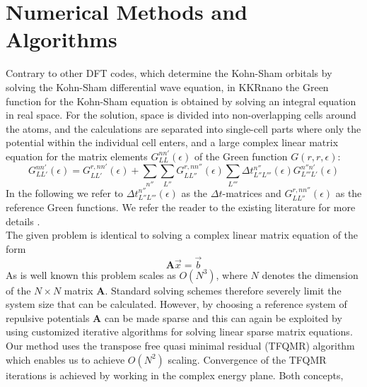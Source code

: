 \documentclass [a4paper, 12pt]{article}
\newcommand{\matr}[1]{\bm{#1}}
\begin{document}
\section{Numerical Methods and Algorithms} 
 

Contrary to other DFT codes, which determine the Kohn-Sham orbitals by solving
the Kohn-Sham differential wave equation, in KKRnano the Green function for the Kohn-Sham
equation is obtained by solving an integral equation in real space. For the solution, space is divided
into non-overlapping cells around the atoms, and the calculations are separated into single-cell parts
where only the potential within the individual cell enters, and a large complex linear matrix equation for 
the matrix elements $G_{LL}^{nn'} (\epsilon)$ of the Green function $G(r, r , \epsilon)$:
\begin{equation}
	G_{LL'}^{nn'} (\epsilon) = G_{LL'}^{r,nn'} (\epsilon) + \sum_{n''} \sum_{L''}
	G_{LL''}^{r,nn''} (\epsilon) \sum_{L'''} \Delta t_{L'' L'''}^{n''} (\epsilon)
	G_{L'''L'}^{n''n'} (\epsilon)
	\label{eq:dyson_eq}
\end{equation}
In the following we refer to $\Delta t_{L'' L'''}^{n''} (\epsilon)$ as the $\Delta t$-matrices and
$G_{LL''}^{r,nn''} (\epsilon)$ as the reference Green functions. We refer the reader to the existing
literature for more details \cite{zeller_towards_2008}.
\\
The given problem is identical to solving a complex linear matrix equation of the form
\begin{equation}
	\label{eq:axb}
	\matr{A} \vec{x} = \vec{b}
\end{equation}
As is well known this problem scales as $O(N^3)$, where $N$ denotes the dimension of the $N \times N$
matrix $\matr{A}$. Standard solving schemes therefore severely limit the system size that can
be calculated.
However, by choosing a reference system of repulsive potentials
$\matr{A}$ can be made sparse and this can again be exploited
by using customized iterative algorithms for solving linear sparse matrix equations.
Our method uses the transpose free quasi minimal residual (TFQMR) algorithm \cite{freund_qmr:_1991}
which enables us to achieve $O(N^2)$ scaling. 
Convergence of the TFQMR iterations is achieved by working in the complex energy plane. Both concepts,
\end{document}
